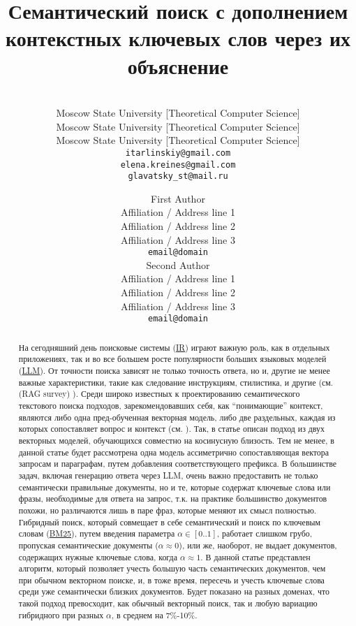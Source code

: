 \documentclass[11pt,a4paper]{article}
\title{Семантический поиск с дополнением контекстных ключевых слов через их объяснение}
\author{\makecell{Igor Tarlinskiy\thanks{\hspace{.06in}Equal contribution}, Elena Kreines, Sergey Glavatskii} \\
Moscow State University [Theoretical Computer Science]\quad\quad \\
Moscow State University [Theoretical Computer Science]\quad\quad\\
Moscow State University [Theoretical Computer Science]\quad\quad\\
\texttt{itarlinskiy@gmail.com}\\
\texttt{elena.kreines@gmail.com}\\
\texttt{glavatsky\_st@mail.ru}\\
}
\author{First Author \\
  Affiliation / Address line 1 \\
  Affiliation / Address line 2 \\
  Affiliation / Address line 3 \\
  \texttt{email@domain} \\\And
  Second Author \\
  Affiliation / Address line 1 \\
  Affiliation / Address line 2 \\
  Affiliation / Address line 3 \\
  \texttt{email@domain} \\}
\date{}
\begin{document}
\maketitle

\begin{abstract}
На сегодняшний день поисковые системы (\href{https://en.wikipedia.org/wiki/Information_retrieval}{IR}) играют важную роль, как в 
отдельных приложениях, так и во все большем росте популярности больших языковых моделей (\href{https://en.wikipedia.org/wiki/Large_language_model}{LLM}).
От точности поиска зависят не только точность ответа, но и, другие не менее важные характеристики, такие как следование инструкциям, стилистика, и другие (см. (RAG survey) \cite{ragsurvey}).
Среди широко известных к проектированию семантического текстового поиска подходов, зарекомендовавших себя, как ``понимающие'' контекст, являются либо одна пред-обученная векторная модель, либо две раздельных, 
каждая из которых сопоставляет вопрос и контекст (см. \cite{dpr}). Так, в статье \cite{dpr} описан подход из двух векторных моделей, обучающихся совместно на косинусную близость. Тем не менее, в данной статье будет рассмотрена одна модель ассиметрично сопоставляющая вектора запросам и параграфам, путем добавления соответствующего префикса.
В большинстве задач, включая генерацию ответа через LLM, очень важно предоставить не только семантически правильные документы, но и те, которые содержат ключевые слова или фразы, необходимые для ответа на запрос, т.к. на практике большинство документов похожи, но различаются лишь в паре фраз, которые меняют их смысл полностью.
Гибридный поиск, который совмещает в себе семантический и поиск по ключевым словам (\href{https://en.wikipedia.org/wiki/Okapi_BM25}{BM25}), путем введения параметра $\alpha \in [0..1]$, работает слишком грубо, пропуская семантические документы ($\alpha \approx 0$), или же, наоборот,
не выдает документов, содержащих нужные ключевые слова, когда $\alpha \approx 1$. В данной статье представлен алгоритм, который позволяет учесть большую часть семантических документов, чем при обычном векторном поиске, и, в тоже время, пересечь и учесть ключевые слова среди уже семантически близких документов.
Будет показано на разных доменах, что такой подход превосходит, как обычный векторный поиск, так и любую вариацию гибридного при разных $\alpha$, в среднем на 7\%-10\%.


\end{abstract}










\clearpage %
\appendix

\end{document}
